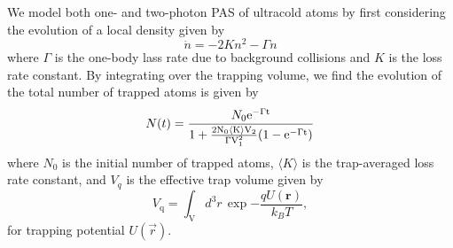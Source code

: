 We model both one- and two-photon PAS of ultracold atoms by first considering the evolution of a local density given by
\begin{equation}
	\dot{n} = -2 K n^2 - \Gamma n
\end{equation}
where $\Gamma$ is the one-body lass rate due to background collisions and $K$ is the loss rate constant.
By integrating over the trapping volume, we find the evolution of the total number of trapped atoms is given by
\begin{equation}\label{eq:number}
   N(t)={N_0 \rm{e}^{-\Gamma t} \over 1+
   {2 N_0 \langle K \rangle V_2\over \Gamma V_1^2}(1-\rm{e}^{-\Gamma t})}
\end{equation}
where $N_0$ is the initial number of trapped atoms, $\langle K \rangle$ is the trap-averaged loss rate constant, and $V_q$ is the effective trap volume given by
\begin{equation}\label{eq:effectivevolumes}
	V_{\text{q}}=\int_{\mathrm{V}} d^3r \, \exp{-\frac{qU(\mathbf{r})}{k_{B}T}},
\end{equation}
for trapping potential $U(\vec{r})$.

